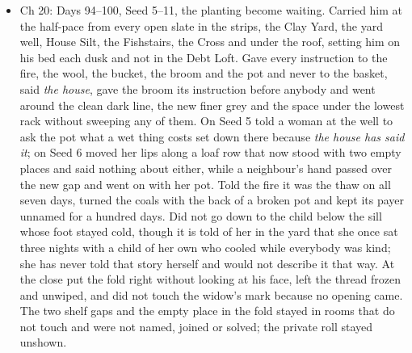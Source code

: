 \documentclass{design/chronicle}
\begin{document}
{\begin{itemize}[leftmargin=1.4em,itemsep=1pt,topsep=3pt,parsep=0pt]
\item Ch 20: Days 94–100, Seed 5–11, the planting become waiting. Carried him at the half-pace from every open slate in the strips, the Clay Yard, the yard well, House Silt, the Fishstairs, the Cross and under the roof, setting him on his bed each dusk and not in the Debt Loft. Gave every instruction to the fire, the wool, the bucket, the broom and the pot and never to the basket, said \emph{the house}, gave the broom its instruction before anybody and went around the clean dark line, the new finer grey and the space under the lowest rack without sweeping any of them. On Seed 5 told a woman at the well to ask the pot what a wet thing costs set down there because \emph{the house has said it}; on Seed 6 moved her lips along a loaf row that now stood with two empty places and said nothing about either, while a neighbour’s hand passed over the new gap and went on with her pot. Told the fire it was the thaw on all seven days, turned the coals with the back of a broken pot and kept its payer unnamed for a hundred days. Did not go down to the child below the sill whose foot stayed cold, though it is told of her in the yard that she once sat three nights with a child of her own who cooled while everybody was kind; she has never told that story herself and would not describe it that way. At the close put the fold right without looking at his face, left the thread frozen and unwiped, and did not touch the widow’s mark because no opening came. The two shelf gaps and the empty place in the fold stayed in rooms that do not touch and were not named, joined or solved; the private roll stayed unshown.

\end{itemize}
}
\end{document}
